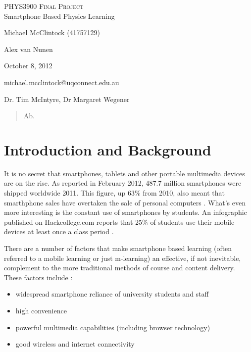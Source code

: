 \documentclass[12pt,a4paper]{article}  %
\begin{document}
\begin{titlepage}
\begin{center}
\textsc{\LARGE PHYS3900 Final Project}\\[1cm]
{\LARGE Smartphone Based Physics Learning}\\[2cm]
\begin{minipage}[t]{0.6\columnwidth} \large
\begin{description}
\itemsep2mm
\small
\item [\emph{Author:}] Michael McClintock (41757129)
\item [\emph{Partner:}] Alex van Nunen
\item [\emph{Date:}] October 8, 2012
\item [\emph{Email:}] michael.mcclintock@uqconnect.edu.au
\item [\emph{Supervisors:}] Dr. Tim McIntyre, Dr Margaret Wegener
\end{description}
\end{minipage}
\vfill
\end{center}
\end{titlepage}

\begin{abstract}
Ab.
\end{abstract}
\thispagestyle{empty}
\newpage

\tableofcontents
\thispagestyle{empty}
\newpage
\setcounter{page}{1}

\section{Introduction and Background}

It is no secret that smartphones, tablets and other portable multimedia devices are on the rise. As reported in February 2012, 487.7 million smartphones were shipped worldwide 2011.  This figure, up 63\% from 2010, also meant that smarthphone sales have overtaken the sale of personal computers \cite{canalys}. What's even more interesting is the constant use of smartphones by students. An infographic published on Hackcollege.com reports that 25\% of students use their mobile devices at least once a class period \cite{hc}.

There are a number of factors that make smartphone based learning (often referred to a mobile learning or just m-learning) an
effective, if not inevitable, complement to the more traditional
methods of course and content delivery. These factors include \cite{worry}:
\begin{itemize}
\item widespread smartphone reliance of university students and staff
\item high convenience
\item powerful multimedia capabilities (including browser technology)
\item good wireless and internet connectivity 
\end{itemize}
\end{document}
